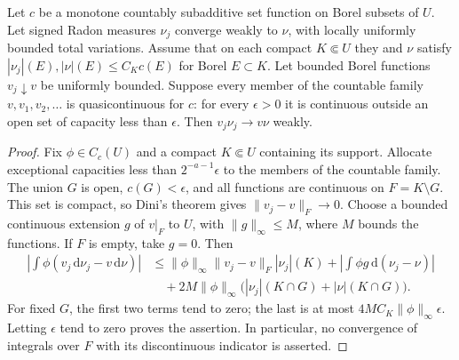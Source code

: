 \begin{lemma}\label{draft619:weighted-measures}
Let $c$ be a monotone countably subadditive set function on Borel subsets
of $U$. Let signed Radon measures $\nu_j$ converge weakly to $\nu$,
with locally uniformly bounded total variations. Assume that on each
compact $K\Subset U$ they and $\nu$ satisfy
$|\nu_j|(E),|\nu|(E)\leq C_Kc(E)$ for Borel $E\subset K$.
Let bounded Borel functions $v_j\downarrow v$ be uniformly bounded.
Suppose every member of the countable family $v,v_1,v_2,\ldots$ is
quasicontinuous for $c$: for every $\epsilon>0$ it is continuous
outside an open set of capacity less than $\epsilon$.
Then $v_j\nu_j\to v\nu$ weakly.
\end{lemma}
\begin{proof}
Fix $\phi\in C_c(U)$ and a compact $K\Subset U$ containing its
support. Allocate exceptional capacities less than
$2^{-a-1}\epsilon$ to the members of the countable family. The union
$G$ is open, $c(G)<\epsilon$, and all functions are continuous on
$F=K\setminus G$. This set is compact, so Dini's theorem gives
$\|v_j-v\|_F\to0$. Choose a bounded continuous extension $g$ of
$v|_F$ to $U$, with $\|g\|_\infty\leq M$, where $M$ bounds the
functions. If $F$ is empty, take $g=0$.
Then
\[
 \begin{split}
 \left|\int\phi(v_j\,\mathrm d\nu_j-v\,\mathrm d\nu)\right|
 &\leq \|\phi\|_\infty\|v_j-v\|_F|\nu_j|(K)
       +\left|\int\phi g\,\mathrm d(\nu_j-\nu)\right|\\
 &\quad+2M\|\phi\|_\infty
                  \bigl(|\nu_j|(K\cap G)+|\nu|(K\cap G)\bigr).
 \end{split}
\]
For fixed $G$, the first two terms tend to zero; the last is at most
$4MC_K\|\phi\|_\infty\epsilon$. Letting $\epsilon$ tend to zero
proves the assertion. In particular, no convergence of integrals
over $F$ with its discontinuous indicator is asserted.
\end{proof}


